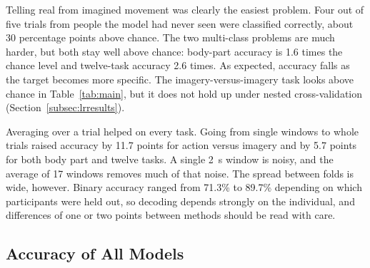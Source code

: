 \documentclass[pdflatex,sn-mathphys-num]{sn-jnl}%
\theoremstyle{thmstyleone}%
\theoremstyle{thmstyletwo}%
\theoremstyle{thmstylethree}%
\begin{document}
\begin{table}[htbp]
\centering
\caption{Accuracy of the proposed ensemble with mirror augmentation. Pooled values count the correctly classified test trials over all folds.}
\label{tab:main}
\end{table}

Telling real from imagined movement was clearly the easiest problem. Four out of five trials from people the model had never seen were classified correctly, about 30 percentage points above chance. The two multi-class problems are much harder, but both stay well above chance: body-part accuracy is 1.6 times the chance level and twelve-task accuracy 2.6 times. As expected, accuracy falls as the target becomes more specific. The imagery-versus-imagery task looks above chance in Table~\ref{tab:main}, but it does not hold up under nested cross-validation (Section~\ref{subsec:lrresults}).

Averaging over a trial helped on every task. Going from single windows to whole trials raised accuracy by 11.7 points for action versus imagery and by 5.7 points for both body part and twelve tasks. A single 2~s window is noisy, and the average of 17 windows removes much of that noise. The spread between folds is wide, however. Binary accuracy ranged from 71.3\% to 89.7\% depending on which participants were held out, so decoding depends strongly on the individual, and differences of one or two points between methods should be read with care.

\subsection{Accuracy of All Models}\label{subsec:allmodels}
\end{document}
